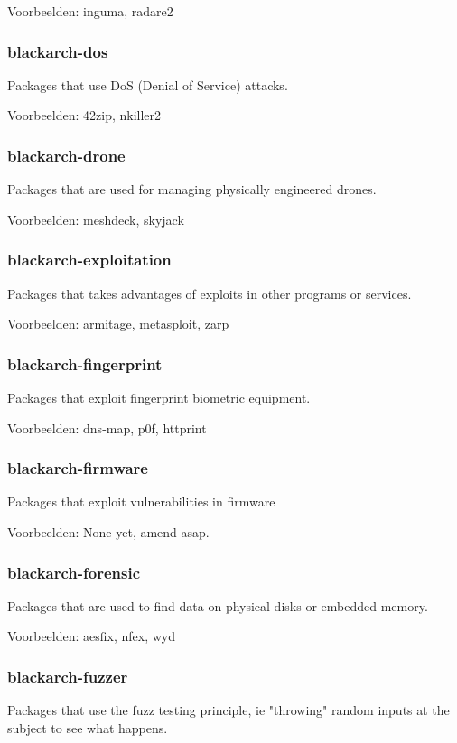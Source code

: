 \documentclass[a4paper, oneside, 11pt]{book}
\begin{document}
Voorbeelden: inguma, radare2

\subsubsection{blackarch-dos}
Packages that use DoS (Denial of Service) attacks.

Voorbeelden: 42zip, nkiller2

\subsubsection{blackarch-drone}
Packages that are used for managing physically engineered
drones.

Voorbeelden: meshdeck, skyjack

\subsubsection{blackarch-exploitation}
Packages that takes advantages of exploits in other programs or services.

Voorbeelden: armitage, metasploit, zarp

\subsubsection{blackarch-fingerprint}
Packages that exploit fingerprint biometric equipment.

Voorbeelden: dns-map, p0f, httprint

\subsubsection{blackarch-firmware}
Packages that exploit vulnerabilities in firmware

Voorbeelden: None yet, amend asap.

\subsubsection{blackarch-forensic}
Packages that are used to find data on physical disks or embedded memory.

Voorbeelden: aesfix, nfex, wyd

\subsubsection{blackarch-fuzzer}
Packages that use the fuzz testing principle, ie
"throwing" random inputs at the subject to see what happens.
\end{document}
